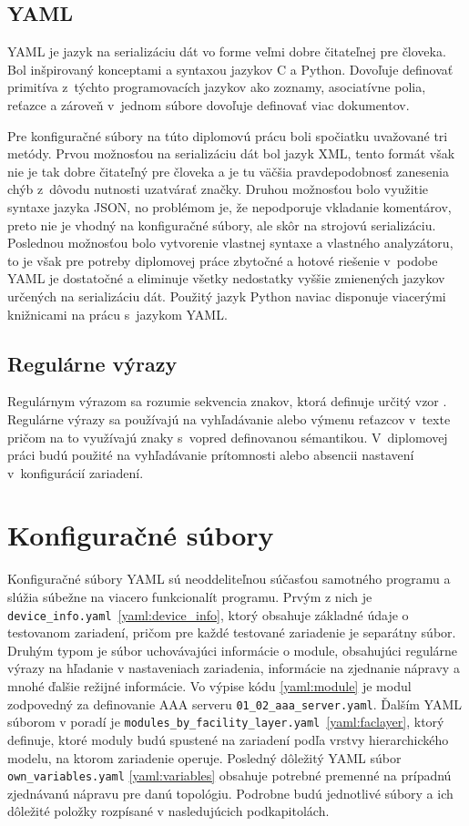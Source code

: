  \subsection{YAML}
 YAML \cite{Jd4UTaVyTULvXDoN} je jazyk na serializáciu dát vo forme veľmi dobre čitateľnej pre človeka. Bol inšpirovaný konceptami a syntaxou jazykov C a Python. Dovoľuje definovať primitíva z~týchto programovacích jazykov ako zoznamy, asociatívne polia, reťazce a zároveň v~jednom súbore dovoľuje definovať viac dokumentov.
 
 Pre konfiguračné súbory na túto diplomovú prácu boli spočiatku uvažované tri metódy. Prvou možnosťou na serializáciu dát bol jazyk XML, tento formát však nie je tak dobre čitateľný pre človeka a je tu väčšia pravdepodobnosť zanesenia chýb z~dôvodu nutnosti uzatvárať značky. Druhou možnosťou bolo využitie syntaxe jazyka JSON, no problémom je, že nepodporuje vkladanie komentárov, preto nie je vhodný na konfiguračné súbory, ale skôr na strojovú serializáciu. Poslednou možnosťou bolo vytvorenie vlastnej syntaxe a vlastného analyzátoru, to je však pre potreby diplomovej práce zbytočné a hotové riešenie v~podobe YAML je dostatočné a eliminuje všetky nedostatky vyššie zmienených jazykov určených na serializáciu dát. Použitý jazyk Python naviac disponuje viacerými knižnicami na prácu s~jazykom YAML.  
 \subsection{Regulárne výrazy}
 Regulárnym výrazom sa rozumie sekvencia znakov, ktorá definuje určitý vzor \cite{sBBUt3Q3bPUfAMue}. Regulárne výrazy sa používajú na vyhľadávanie alebo výmenu reťazcov v~texte pričom na to využívajú znaky s~vopred definovanou sémantikou. V~diplomovej práci budú použité na vyhľadávanie prítomnosti alebo absencii nastavení v~konfigurácií zariadení. 

\section{Konfiguračné súbory}
Konfiguračné súbory YAML sú neoddeliteľnou súčasťou samotného programu a slúžia súbežne na viacero funkcionalít programu. Prvým z nich je \mbox{\texttt{device\_info.yaml} \ref{yaml:device_info}}, ktorý obsahuje základné údaje o testovanom zariadení, pričom pre každé testované zariadenie je separátny súbor. Druhým typom je súbor uchovávajúci informácie o module, obsahujúci regulárne výrazy na hľadanie v nastaveniach zariadenia, informácie na zjednanie nápravy a mnohé ďalšie režijné informácie. Vo výpise kódu \ref{yaml:module} je modul zodpovedný za definovanie AAA serveru \texttt{01\_02\_aaa\_server.yaml}. Ďalším YAML súborom v poradí je \mbox{\texttt{modules\_by\_facility\_layer.yaml} \ref{yaml:faclayer}}, ktorý definuje, ktoré moduly budú spustené na zariadení podľa vrstvy hierarchického modelu, na ktorom zariadenie operuje. Posledný dôležitý YAML súbor \texttt{own\_variables.yaml} \ref{yaml:variables} obsahuje potrebné premenné na prípadnú zjednávanú nápravu pre danú topológiu. Podrobne budú jednotlivé súbory a ich dôležité položky rozpísané v nasledujúcich podkapitolách.
